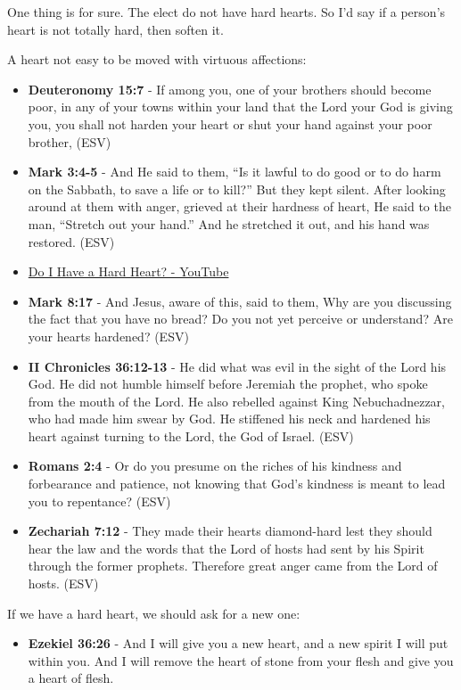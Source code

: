 \documentclass[11pt]{article}
\begin{document}
One thing is for sure. The elect do not have hard hearts.
So I'd say if a person's heart is not totally hard, then soften it.

A heart not easy to be moved with virtuous affections:
\begin{itemize}
\item \textbf{Deuteronomy 15:7} - If among you, one of your brothers should become poor, in any of your towns within your land that the Lord your God is giving you, you shall not harden your heart or shut your hand against your poor brother, (ESV)
\item \textbf{Mark 3:4-5} - And He said to them, “Is it lawful to do good or to do harm on the Sabbath, to save a life or to kill?” But they kept silent. After looking around at them with anger, grieved at their hardness of heart, He said to the man, “Stretch out your hand.” And he stretched it out, and his hand was restored. (ESV)
\item \href{https://www.youtube.com/watch?v=JaMVzW9yiBc}{Do I Have a Hard Heart? - YouTube}
\item \textbf{Mark 8:17} - And Jesus, aware of this, said to them, Why are you discussing the fact that you have no bread? Do you not yet perceive or understand? Are your hearts hardened? (ESV)
\item \textbf{II Chronicles 36:12-13} - He did what was evil in the sight of the Lord his God. He did not humble himself before Jeremiah the prophet, who spoke from the mouth of the Lord. He also rebelled against King Nebuchadnezzar, who had made him swear by God. He stiffened his neck and hardened his heart against turning to the Lord, the God of Israel. (ESV)
\item \textbf{Romans 2:4} - Or do you presume on the riches of his kindness and forbearance and patience, not knowing that God's kindness is meant to lead you to repentance? (ESV)
\item \textbf{Zechariah 7:12} - They made their hearts diamond-hard lest they should hear the law and the words that the Lord of hosts had sent by his Spirit through the former prophets. Therefore great anger came from the Lord of hosts. (ESV)
\end{itemize}

If we have a hard heart, we should ask for a new one:
\begin{itemize}
\item \textbf{Ezekiel 36:26} - And I will give you a new heart, and a new spirit I will put within you. And I will remove the heart of stone from your flesh and give you a heart of flesh.
\end{itemize}
\end{document}
